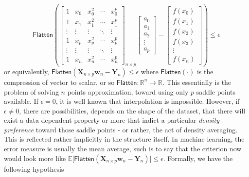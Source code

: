 \begin{equation}\label{eq:soft_hard_interpolation_role}
\mathsf{Flatten}\left(\begin{bmatrix}
1 & x_0 & x_0^2 & \cdots & x_0^p \\
1 & x_1 & x_1^2 & \cdots & x_1^p \\
\vdots & \vdots & \vdots & \ddots & \vdots \\
1 & x_p & x_p^2 & \cdots & x_p^p \\
\vdots & \vdots & \vdots & \ddots & \vdots \\
1 & x_n & x_n^2 & \cdots & x_n^p
\end{bmatrix}_{n\times p}
\begin{bmatrix}
a_0 \\
a_1 \\
a_2 \\
\vdots \\
a_p
\end{bmatrix}
- 
\begin{bmatrix}
f(x_0) \\
f(x_1) \\
f(x_2) \\
f(x_3) \\
\vdots \\
f(x_n)
\end{bmatrix}\right)
\leq \epsilon
\end{equation}
or equivalently, $\mathsf{Flatten}(\mathbf{X}_{n\times p}\mathbf{w}_{n}-\mathbf{Y}_{n})\leq \epsilon$ where $\mathsf{Flatten}(\cdot)$ is the compression of vector to scalar, or so $\mathsf{Flatten}: \mathbb{R}^{n}\to \mathbb{R}$. This essentially is the problem of solving $n$ points approximation, toward using only $p$ saddle points available. If $\epsilon =0$, it is well known that interpolation is impossible. However, if $\epsilon\ne 0$, there are possibilities, depends on the shape of the dataset, that there will exist a data-dependent property or more that indict a particular \textit{density preference} toward those saddle points - or rather, the act of density averaging. This is reflected rather implicitly in the structure itself. In machine learning, the error measure is usually the mean average, such is to say that the criterion now would look more like $\mathbb{E}\Big[\mathsf{Flatten}(\mathbf{X}_{n\times p}\mathbf{w}_{n}-\mathbf{Y}_{n})\Big]\leq \epsilon$. Formally, we have the following hypothesis

